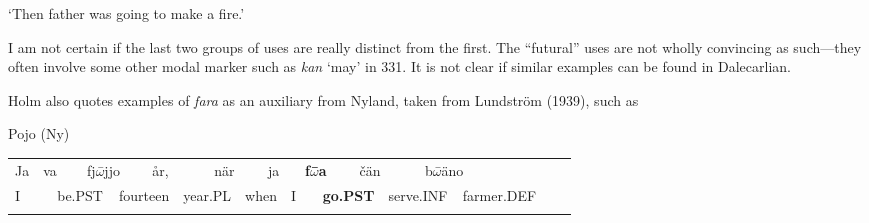 \begin{styleTranslation}
‘Then father was going to make a fire.’

\end{styleTranslation}

\begin{styleBodyTextFirst}
I am not certain if the last two groups of uses are really distinct from the first. The “futural” uses are not wholly convincing as such—they often involve some other modal marker such as \textit{kan} ‘may’ in 331. It is not clear if similar examples can be found in Dalecarlian. 

\end{styleBodyTextFirst}

\begin{styleBodytextC}
Holm also quotes examples of \textit{fara} as an auxiliary from Nyland, taken from Lundström (1939), such as

\end{styleBodytextC}

\begin{listWWNumileveli}
\item 

\begin{styleExample}
Pojo (Ny) 

\end{styleExample}

\end{listWWNumileveli}

\begin{tabular}{llllllllllllllllllll}
\lsptoprule
Ja & \multicolumn{2}{l}{va

} & \multicolumn{2}{l}{fj$\omega $\={ }jjo 

} & \multicolumn{2}{l}{år,

} & \multicolumn{2}{l}{när

} & \multicolumn{2}{l}{ja

} & \multicolumn{2}{l}{\textbf{f}\textbf{$\omega $}\textbf{\={ }a}

} & \multicolumn{2}{l}{čän

} & \multicolumn{2}{l}{b$\omega $\={ }äno 

} & \multicolumn{2}{l}{} & \\
\multicolumn{2}{l}{I

} & \multicolumn{2}{l}{be.PST

} & \multicolumn{2}{l}{fourteen

} & \multicolumn{2}{l}{year.PL

} & \multicolumn{2}{l}{when

} & \multicolumn{2}{l}{I

} & \multicolumn{2}{l}{{\bfseries go.PST}

} & \multicolumn{2}{l}{serve.INF

} & \multicolumn{2}{l}{farmer.DEF

} & \multicolumn{2}{l}{}\\
\lspbottomrule
\end{tabular}


